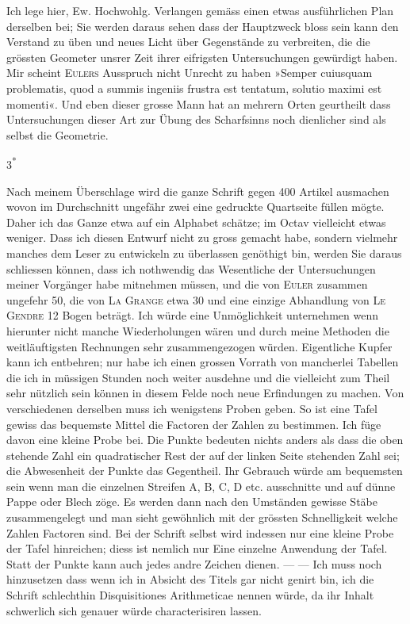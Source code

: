 Ich lege hier, Ew. Hochwohlg. Verlangen gemäss einen etwas ausführlichen Plan derselben bei; Sie werden daraus sehen dass der Hauptzweck bloss sein kann den Verstand zu üben und neues Licht über Gegenstände zu verbreiten, die die grössten Geometer unsrer Zeit ihrer eifrigsten Untersuchungen gewürdigt haben. Mir scheint \textsc{Eulers} Ausspruch nicht Unrecht zu haben »Semper cuiusquam problematis, quod a summis ingeniis frustra est tentatum, solutio maximi est momenti«. Und eben dieser grosse Mann hat an mehrern Orten geurtheilt dass Untersuchungen dieser Art zur Übung des Scharfsinns noch dienlicher sind als selbst die Geometrie.
\vfill\begin{flushright}\small 3\textsuperscript{*}\end{flushright}
\clearpage
{}\par\indent Nach meinem Überschlage wird die ganze Schrift gegen 400 Artikel ausmachen wovon im Durchschnitt ungefähr zwei eine gedruckte Quartseite füllen mögte. Daher ich das Ganze etwa auf ein Alphabet schätze; im Octav vielleicht etwas weniger. Dass ich diesen Entwurf nicht zu gross gemacht habe, sondern vielmehr manches dem Leser zu entwickeln zu überlassen genöthigt bin, werden Sie daraus schliessen können, dass ich nothwendig das Wesentliche der Untersuchungen meiner Vorgänger habe mitnehmen müssen, und die von \textsc{Euler} zusammen ungefehr 50, die von \textsc{La Grange} etwa 30 und eine einzige Abhandlung von \textsc{Le Gendre} 12 Bogen beträgt. Ich würde eine Unmöglichkeit unternehmen wenn hierunter nicht manche Wiederholungen wären und durch meine Methoden die weitläuftigsten Rechnungen sehr zusammengezogen würden. Eigentliche Kupfer kann ich entbehren; nur habe ich einen grossen Vorrath von mancherlei Tabellen die ich in müssigen Stunden noch weiter ausdehne und die vielleicht zum Theil sehr nützlich sein können in diesem Felde noch neue Erfindungen zu machen. Von verschiedenen derselben muss ich wenigstens Proben geben. So ist eine Tafel gewiss das bequemste Mittel die Factoren der Zahlen zu bestimmen. Ich füge davon eine kleine Probe bei. Die Punkte bedeuten nichts anders als dass die oben stehende Zahl ein quadratischer Rest der auf der linken Seite stehenden Zahl sei; die Abwesenheit der Punkte das Gegentheil. Ihr Gebrauch würde am bequemsten sein wenn man die einzelnen Streifen A, B, C, D etc. ausschnitte und auf dünne Pappe oder Blech zöge. Es werden dann nach den Umständen gewisse Stäbe zusammengelegt und man sieht gewöhnlich mit der grössten Schnelligkeit welche Zahlen  Factoren sind. Bei der Schrift selbst wird indessen nur eine kleine Probe der Tafel hinreichen; diess ist nemlich nur Eine einzelne Anwendung der Tafel. Statt der Punkte kann auch jedes andre Zeichen dienen. — — Ich muss noch hinzusetzen dass wenn ich in Absicht des Titels gar nicht genirt bin, ich die Schrift schlechthin Disquisitiones Arithmeticae nennen würde, da ihr Inhalt schwerlich sich genauer würde characterisiren lassen.

